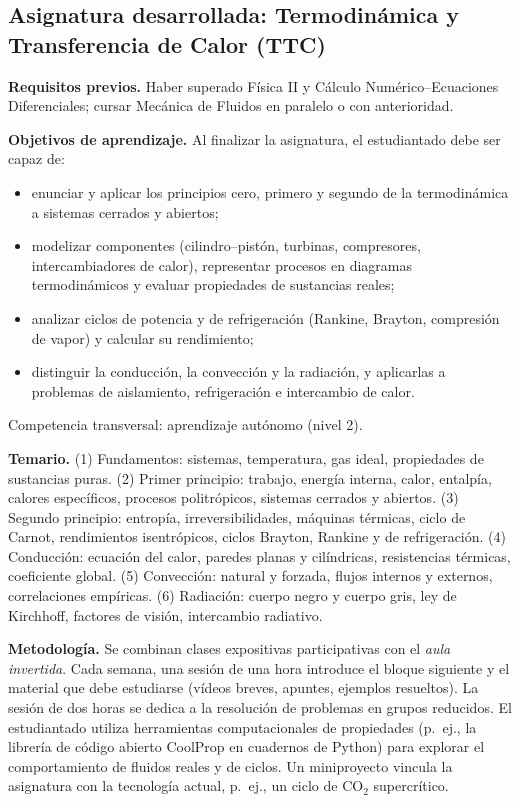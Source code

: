 \documentclass[11pt]{article}
\begin{document}
\subsection{Asignatura desarrollada: Termodinámica y Transferencia de Calor (TTC)}\label{sec:ttc}

\textbf{Requisitos previos.} Haber superado Física II y Cálculo Numérico--Ecuaciones
Diferenciales; cursar Mecánica de Fluidos en paralelo o con anterioridad.

\textbf{Objetivos de aprendizaje.} Al finalizar la asignatura, el estudiantado debe ser capaz de:
\begin{itemize}
\item enunciar y aplicar los principios cero, primero y segundo de la termodinámica a sistemas cerrados y abiertos;
\item modelizar componentes (cilindro--pistón, turbinas, compresores, intercambiadores de
calor), representar procesos en diagramas termodinámicos y evaluar propiedades de sustancias reales;
\item analizar ciclos de potencia y de refrigeración (Rankine, Brayton, compresión de vapor) y calcular su rendimiento;
\item distinguir la conducción, la convección y la radiación, y aplicarlas a problemas de aislamiento, refrigeración e intercambio de calor.
\end{itemize}
Competencia transversal: aprendizaje autónomo (nivel 2).

\textbf{Temario.}
(1) Fundamentos: sistemas, temperatura, gas ideal, propiedades de sustancias puras.
(2) Primer principio: trabajo, energía interna, calor, entalpía, calores específicos, procesos politrópicos, sistemas cerrados y abiertos.
(3) Segundo principio: entropía, irreversibilidades, máquinas térmicas, ciclo de Carnot, rendimientos isentrópicos, ciclos Brayton, Rankine y de refrigeración.
(4) Conducción: ecuación del calor, paredes planas y cilíndricas, resistencias térmicas, coeficiente global.
(5) Convección: natural y forzada, flujos internos y externos, correlaciones empíricas.
(6) Radiación: cuerpo negro y cuerpo gris, ley de Kirchhoff, factores de visión, intercambio radiativo.

\textbf{Metodología.} Se combinan clases expositivas participativas con el \emph{aula
invertida}. Cada semana, una sesión de una hora introduce el bloque siguiente y el material
que debe estudiarse (vídeos breves, apuntes, ejemplos resueltos). La sesión de dos horas se
dedica a la resolución de problemas en grupos reducidos. El estudiantado utiliza
herramientas computacionales de propiedades (p.~ej., la librería de código abierto CoolProp
en cuadernos de Python) para explorar el comportamiento de fluidos reales y de ciclos. Un
miniproyecto vincula la asignatura con la tecnología actual, p.~ej., un ciclo de CO$_2$
supercrítico.
\end{document}
